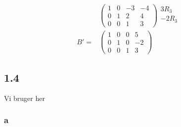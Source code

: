 \begin{align*}
				&\left(\begin{array}{llll}{1} & {0} & {-3} & {-4} \\ {0} & {1} & {2} & {4} \\ {0} & {0} & {1} & {3}\end{array}\right) \begin{array}{c} 3R_3 \\ -2R_3 \\ \, \end{array}\\
				B'=&\left(\begin{array}{llll}{1} & {0} & {0} & {5} \\ {0} & {1} & {0} & {-2} \\ {0} & {0} & {1} & {3}\end{array}\right) 
			\end{align*} 

		\subsection{1.4}

		Vi bruger her \cite[Sætning 1.2.18]{hesselholt2017}

		\subsubsection{a}

